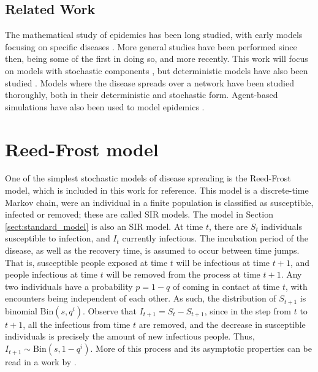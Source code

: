 \documentclass[aap]{imsart}
\theoremstyle{remark}
\begin{document}
\subsection{Related Work}\label{sect:related_work}
The mathematical study of epidemics has been long studied, with early models focusing on specific diseases \citep{BERNOULLI_1760, Ross_1910}. More general studies have been performed since then, being \citet{Kermack_McKendrick_1927} some of the first in doing so, and \citet{Bailey_1975, Frauenthal_1980, Brauer_Castillo-Chavez-2012} more recently. This work will focus on models with stochastic components \citep{Andersson_Britton_2000, Britton_2010}, but deterministic models have also been studied \citep{Hethcote_2000}. Models where the disease spreads over a network have been studied thoroughly, both in their deterministic \citep{Mei_Mohagheghi_Zampieri_Bullo_2017} and stochastic \citep{Britton_2019, Trapman_Bootsma_2009} form. Agent-based simulations have also been used to model epidemics \citep{Hoertel_Blachier_Blanco_Olfson_Massetti_Rico_Limosin_Leleu_2020}.

\section{Reed-Frost model}\label{sect:reedfrost} One of the simplest stochastic models of disease spreading is the Reed-Frost model, which is included in this work for reference. This model is a discrete-time Markov chain, were an individual in a finite population is classified as susceptible, infected or removed; these are called SIR models. The model in Section \ref{sect:standard_model} is also an SIR model. At time $t$, there are $S_t$ individuals susceptible to infection, and $I_t$ currently infectious. The incubation period of the disease, as well as the recovery time, is assumed to occur between time jumps. That is, susceptible people exposed at time $t$ will be infectious at time $t+1$, and people infectious at time $t$ will be removed from the process at time $t+1$.  Any two individuals have a probability $p = 1-q$ of coming in contact at time $t$, with encounters being independent of each other. As such, the distribution of $S_{t+1}$ is binomial $\mathrm{Bin}(s, q^i)$. Observe that $I_{t+1} = S_t - S_{t+1}$, since in the step from $t$ to $t+1$, all the infectious from time $t$ are removed, and the decrease in susceptible individuals is precisely the amount of new infectious people. Thus, $I_{t+1} \sim \mathrm{Bin}(s, 1-q^i)$. More of this process and its asymptotic properties can be read in a work by \citet{VonBahr}.
\end{document}
